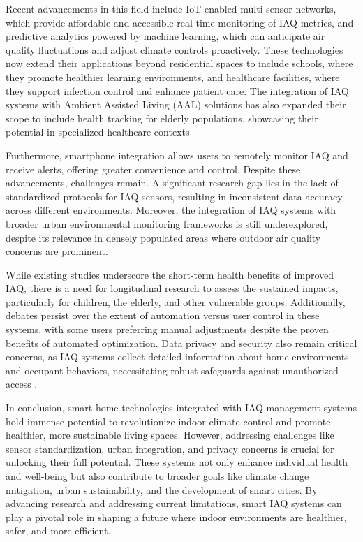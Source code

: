 \documentclass[a4paper]{scrartcl}
\begin{document}
Recent advancements in this field include IoT-enabled multi-sensor networks, which provide affordable and accessible real-time monitoring of IAQ metrics, and predictive analytics powered by machine learning, which can anticipate air quality fluctuations and adjust climate controls proactively. These technologies now extend their applications beyond residential spaces to include schools, where they promote healthier learning environments, and healthcare facilities, where they support infection control and enhance patient care. The integration of IAQ systems with Ambient Assisted Living (AAL) solutions has also expanded their scope to include health tracking for elderly populations, showcasing their potential in specialized healthcare contexts \cite{r2}

Furthermore, smartphone integration allows users to remotely monitor IAQ and receive alerts, offering greater convenience and control. Despite these advancements, challenges remain. A significant research gap lies in the lack of standardized protocols for IAQ sensors, resulting in inconsistent data accuracy across different environments. Moreover, the integration of IAQ systems with broader urban environmental monitoring frameworks is still underexplored, despite its relevance in densely populated areas where outdoor air quality concerns are prominent.

While existing studies underscore the short-term health benefits of improved IAQ, there is a need for longitudinal research to assess the sustained impacts, particularly for children, the elderly, and other vulnerable groups. Additionally, debates persist over the extent of automation versus user control in these systems, with some users preferring manual adjustments despite the proven benefits of automated optimization. Data privacy and security also remain critical concerns, as IAQ systems collect detailed information about home environments and occupant behaviors, necessitating robust safeguards against unauthorized access \cite{r16}. 

In conclusion, smart home technologies integrated with IAQ management systems hold immense potential to revolutionize indoor climate control and promote healthier, more sustainable living spaces. However, addressing challenges like sensor standardization, urban integration, and privacy concerns is crucial for unlocking their full potential. These systems not only enhance individual health and well-being but also contribute to broader goals like climate change mitigation, urban sustainability, and the development of smart cities. By advancing research and addressing current limitations, smart IAQ systems can play a pivotal role in shaping a future where indoor environments are healthier, safer, and more efficient.
\end{document}
